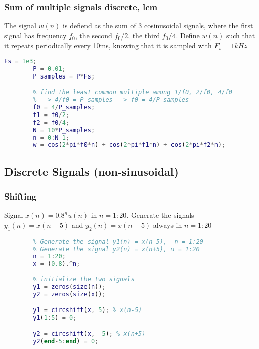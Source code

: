     \subsubsection{Sum of multiple signals discrete, lcm}
    The signal $w(n)$ is defiend as the sum of 3 cosinusoidal signals, where the first signal has frequency $f_0$, the second $f_0/2$, the third $f_0/4$. Define $w(n)$ such that it repeats periodically every 10ms, knowing that it is sampled with $F_s=1kHz$
    \begin{lstlisting}[language=Matlab, escapeinside=`']
        Fs = 1e3;
        P = 0.01;
        P_samples = P*Fs;

        % find the least common multiple among 1/f0, 2/f0, 4/f0
        % --> 4/f0 = P_samples --> f0 = 4/P_samples
        f0 = 4/P_samples;
        f1 = f0/2;
        f2 = f0/4;
        N = 10*P_samples;
        n = 0:N-1;
        w = cos(2*pi*f0*n) + cos(2*pi*f1*n) + cos(2*pi*f2*n);
    \end{lstlisting}

\subsection{Discrete Signals (non-sinusoidal)}

    \subsubsection{Shifting}
    Signal $x(n)=0.8^nu(n)$ in $n=1:20$. Generate the signals $y_1(n)=x(n-5)$ and $y_2(n)=x(n+5)$ always in $n=1:20$
    \begin{lstlisting}[language=Matlab, escapeinside=`']
        % Generate the signal x(n) = (0.8)^n u(n), n = 1:20
        % Generate the signal y1(n) = x(n-5),  n = 1:20
        % Generate the signal y2(n) = x(n+5), n = 1:20
        n = 1:20;
        x = (0.8).^n;
        
        % initialize the two signals
        y1 = zeros(size(n));
        y2 = zeros(size(x));

        y1 = circshift(x, 5); % x(n-5)
        y1(1:5) = 0;

        y2 = circshift(x, -5); % x(n+5)
        y2(end-5:end) = 0;
    \end{lstlisting}

